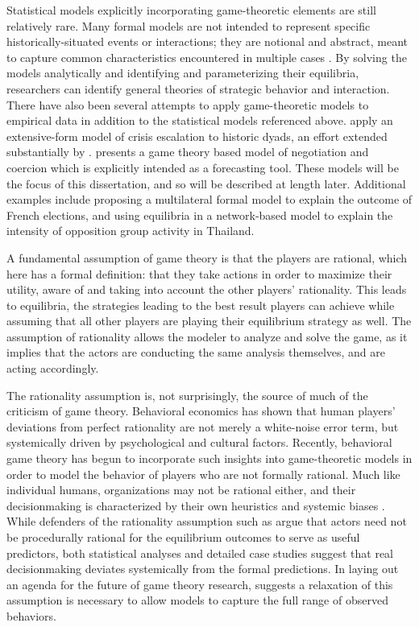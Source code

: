 Statistical models explicitly incorporating game-theoretic elements are still relatively rare. Many formal models are not intended to represent specific historically-situated events or interactions; they are notional and abstract, meant to capture common characteristics encountered in multiple cases \citep{snidal_1985}. By solving the models analytically and identifying and parameterizing their equilibria, researchers can identify general theories of strategic behavior and interaction. There have also been several attempts to apply game-theoretic models to empirical data in addition to the statistical models referenced above. \citet{bdm_1992} apply an extensive-form model of crisis escalation to historic dyads, an effort extended substantially by \citet{bennett_2000}. \citet{bdm_1994,bdm_1997,bdm_2002} presents a game theory based model of negotiation and coercion which is explicitly intended as a forecasting tool. These models will be the focus of this dissertation, and so will be described at length later. Additional examples include \citet{tsebelis_1988} proposing a multilateral formal model to explain the outcome of French elections, and \citet{metternich_2013} using equilibria in a network-based model to explain the intensity of opposition group activity in Thailand.

A fundamental assumption of game theory is that the players are rational, which here has a formal definition: that they take actions in order to maximize their utility, aware of and taking into account the other players' rationality. This leads to equilibria, the strategies leading to the best result players can achieve while assuming that all other players are playing their equilibrium strategy as well. The assumption of rationality allows the modeler to analyze and solve the game, as it implies that the actors are conducting the same analysis themselves, and are acting accordingly.

The rationality assumption is, not surprisingly, the source of much of the criticism of game theory. Behavioral economics has shown that human players' deviations from perfect rationality are not merely a white-noise error term, but systemically driven by psychological \citep{tversky_1981} and cultural \citep{henrich_2005} factors. Recently, behavioral game theory has begun to incorporate such insights into game-theoretic models \citep{camerer_2003} in order to model the behavior of players who are not formally rational. Much like individual humans, organizations may not be rational either, and their decisionmaking is characterized by their own heuristics \citep{march_1993} and systemic biases \citep{shapira_2002}. While defenders of the rationality assumption such as \citet{friedman_1953} argue that actors need not be procedurally rational \citep{simon_1976} for the equilibrium outcomes to serve as useful predictors, both statistical analyses \citep{bennett_2000} and detailed case studies \citep{allison_1999,kaufmann_1994} suggest that real decisionmaking deviates systemically from the formal predictions. In laying out an agenda for the future of game theory research, \citet{fudenberg_2010} suggests a relaxation of this assumption is necessary to allow models to capture the full range of observed behaviors.

